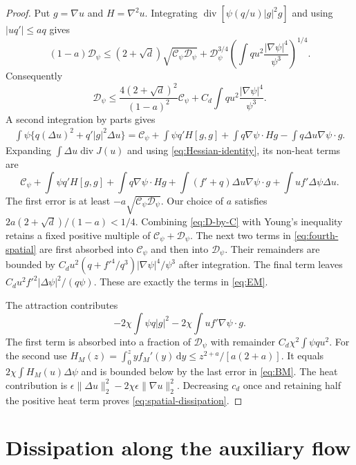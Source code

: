 \documentclass[11pt]{article}
\numberwithin{equation}{section}
\theoremstyle{definition}
\theoremstyle{remark}
\newcommand{\dd}{\,\mathrm d}
\newcommand{\Div}{\operatorname{div}}
\newcommand{\norm}[1]{\lVert #1\rVert}
\newcommand{\Cpsi}{\mathcal C_\psi}
\newcommand{\Dpsi}{\mathcal D_\psi}
\begin{document}
\begin{proof}
Put $g=\nabla u$ and $H=\nabla^2u$. Integrating
$\Div[\psi(q/u)|g|^2g]$ and using $|uq'|\le aq$ gives
\[
 (1-a)\Dpsi\le(2+\sqrt d)\sqrt{\Cpsi\Dpsi}
       +\Dpsi^{3/4}\left(\int qu^2
                        \frac{|\nabla\psi|^4}{\psi^3}\right)^{1/4}.
\]
Consequently
\begin{equation}\label{eq:D-by-C}
 \Dpsi\le\frac{4(2+\sqrt d)^2}{(1-a)^2}\Cpsi
              +C_d\int qu^2\frac{|\nabla\psi|^4}{\psi^3}.
\end{equation}
A second integration by parts gives
\begin{align}\label{eq:Hessian-identity}
 \int\psi\{q(\Delta u)^2+q'|g|^2\Delta u\}
 =\Cpsi+\int\psi q'H[g,g]
       +\int q\nabla\psi\cdot Hg-\int q\Delta u\nabla\psi\cdot g.
\end{align}
Expanding $\int\Delta u\Div J(u)$ and using
\eqref{eq:Hessian-identity}, its non-heat terms are
\begin{equation}\label{eq:fourth-spatial}
 \Cpsi+\int\psi q'H[g,g]+
 \int q\nabla\psi\cdot Hg
 +\int(f'+q)\Delta u\nabla\psi\cdot g
 +\int uf'\Delta\psi\Delta u.
\end{equation}
The first error is at least $-a\sqrt{\Cpsi\Dpsi}$.
Our choice of $a$ satisfies
$2a(2+\sqrt d)/(1-a)<1/4$. Combining \eqref{eq:D-by-C}
with Young's inequality retains a fixed positive multiple of
$\Cpsi+\Dpsi$.
The next two terms in \eqref{eq:fourth-spatial} are first absorbed into
$\Cpsi$ and then into $\Dpsi$. Their remainders are bounded by
$C_du^2(q+f'^4/q^3)|\nabla\psi|^4/\psi^3$ after integration.
The final term leaves $C_du^2 f'^2|\Delta\psi|^2/(q\psi)$.
These are exactly the terms in \eqref{eq:EM}.

The attraction contributes
\[
 -2\chi\int\psi q|g|^2-2\chi\int uf'\nabla\psi\cdot g.
\]
The first term is absorbed into a fraction of $\Dpsi$ with remainder
$C_d\chi^2\int\psi qu^2$. For the second use
$H_M(z)=\int_0^z y f_M'(y)\dd y\le z^{2+a}/[a(2+a)]$.
It equals $2\chi\int H_M(u)\Delta\psi$ and is bounded below by the
last error in \eqref{eq:BM}. The heat contribution is
$\epsilon\norm{\Delta u}_2^2-2\chi\epsilon\norm{\nabla u}_2^2$.
Decreasing $c_d$ once and retaining half the positive heat term proves
\eqref{eq:spatial-dissipation}.
\end{proof}

\section{Dissipation along the auxiliary flow}\label{sec:dissipation}
\end{document}
